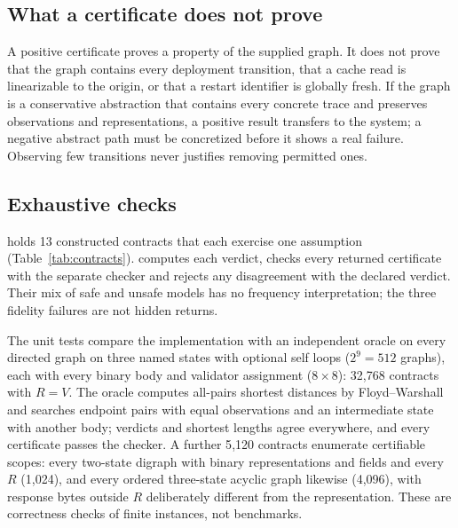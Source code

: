 \subsection{What a certificate does not prove}
A positive certificate proves a property of the supplied graph. It does not
prove that the graph contains every deployment transition, that a cache read
is linearizable to the origin, or that a restart identifier is globally
fresh. If the graph is a conservative abstraction that contains every concrete
trace and preserves observations and representations, a positive result
transfers to the system; a negative abstract path must be concretized before
it shows a real failure. Observing few transitions never justifies removing
permitted ones.

\subsection{Exhaustive checks}
 holds 13 constructed contracts that
each exercise one assumption (Table~\ref{tab:contracts}).
 computes each verdict, checks every returned
certificate with the separate checker and rejects any disagreement with the
declared verdict. Their mix of safe and unsafe models has no frequency
interpretation; the three fidelity failures are not hidden returns.

\begin{table}[t]
\caption{The constructed contracts: verdicts and shortest violations, in transitions.}
\label{tab:contracts}
\small

\end{table}

The unit tests compare the implementation with an independent oracle on every
directed graph on three named states with optional self loops ($2^9=512$
graphs), each with every binary body and validator assignment ($8\times8$):
32{,}768 contracts with $R=V$. The oracle computes all-pairs shortest
distances by Floyd--Warshall and searches endpoint pairs with equal
observations and an intermediate state with another body; verdicts and
shortest lengths agree everywhere, and every certificate passes the checker.
A further 5{,}120 contracts enumerate certifiable scopes: every two-state
digraph with binary representations and fields and every $R$ (1{,}024), and
every ordered three-state acyclic graph likewise (4{,}096), with response
bytes outside $R$ deliberately different from the representation. These are
correctness checks of finite instances, not benchmarks.
